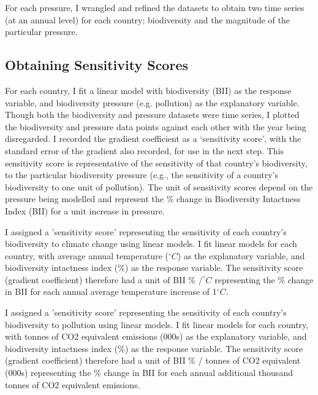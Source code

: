 \documentclass[11pt, a4paper, titlepage]{article}
\begin{document}
	For each pressure, I wrangled and refined the datasets to obtain two time series (at an annual level) for each country; biodiversity and the magnitude of the particular pressure.
	
	
	\subsection*{Obtaining Sensitivity Scores}
	
	For each country, I fit a linear model with biodiversity (BII) as the response variable, and biodiversity pressure (e.g. pollution) as the explanatory variable. Though both the biodiversity and pressure datasets were time series, I plotted the biodiversity and pressure data points against each other with the year being disregarded. I recorded the gradient coefficient as a `sensitivity score', with the standard error of the gradient also recorded, for use in the next step. This sensitivity score is representative of the sensitivity of that country's biodiversity, to the particular biodiversity pressure (e.g., the sensitivity of a country's biodiversity to one unit of pollution). The unit of sensitivity scores depend on the pressure being modelled and represent the \% change in Biodiversity Intactness Index (BII) for a unit increase in pressure.  
	
	I assigned a 'sensitivity score' representing the sensitivity of each country's biodiversity to climate change using linear models. I fit linear models for each country, with average annual temperature ($^\circ C$) as the explanatory variable, and biodiversity intactness index (\%) as the response variable. The sensitivity score (gradient coefficient) therefore had a unit of BII \% $/ ^\circ C$ representing the \% change in BII for each annual average temperature increase of 1$^\circ C$.
	
	I assigned a 'sensitivity score' representing the sensitivity of each country's biodiversity to pollution using linear models. I fit linear models for each country, with tonnes of CO2 equivalent emissions (000s) as the explanatory variable, and biodiversity intactness index (\%) as the response variable. The sensitivity score (gradient coefficient) therefore had a unit of BII \% / tonnes of CO2 equivalent (000s) representing the \% change in BII for each annual additional thousand tonnes of CO2 equivalent emissions. 
	
\end{document}
